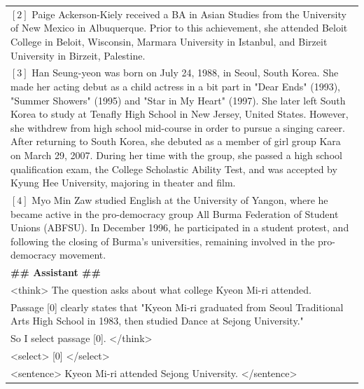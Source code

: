\begin{table}[h!]
{\begin{tabular}{p{\textwidth}}
$[2]$ Paige Ackerson-Kiely received a BA in Asian Studies from the University of New Mexico in Albuquerque. Prior to this achievement, she attended Beloit College in Beloit, Wisconsin, Marmara University in Istanbul, and Birzeit University in Birzeit, Palestine. \\
$[3]$ Han Seung-yeon was born on July 24, 1988, in Seoul, South Korea. She made her acting debut as a child actress in a bit part in "Dear Ends" (1993), "Summer Showers" (1995) and "Star in My Heart" (1997). She later left South Korea to study at Tenafly High School in New Jersey, United States. However, she withdrew from high school mid-course in order to pursue a singing career. After returning to South Korea, she debuted as a member of girl group Kara on March 29, 2007. During her time with the group, she passed a high school qualification exam, the College Scholastic Ability Test, and was accepted by Kyung Hee University, majoring in theater and film. \\
$[4]$ Myo Min Zaw studied English at the University of Yangon, where he became active in the pro-democracy group All Burma Federation of Student Unions (ABFSU). In December 1996, he participated in a student protest, and following the closing of Burma's universities, remaining involved in the pro-democracy movement. \\
\midrule
\textbf{\#\# Assistant \#\#} \\
\textless think\textgreater 
The question asks about what college Kyeon Mi-ri attended. \\
Passage [0] clearly states that "Kyeon Mi-ri graduated from Seoul Traditional Arts High School in 1983, then studied Dance at Sejong University." \\
So I select passage [0].
\textless /think\textgreater \\
\textless select\textgreater 
[0]
\textless /select\textgreater \\
\textless sentence\textgreater
Kyeon Mi-ri attended Sejong University.
\textless /sentence\textgreater \\
\bottomrule
\end{tabular}
}
\label{worker_text}
\end{table}

